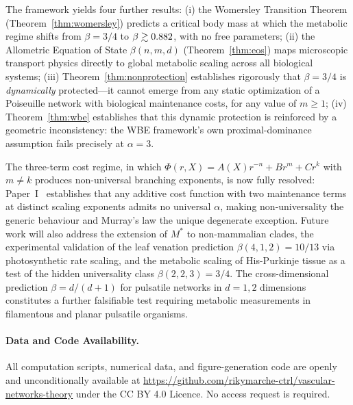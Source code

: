 \documentclass[11pt,a4paper]{article}
\theoremstyle{remark}
\begin{document}
The framework yields four further results: (i) the Womersley Transition Theorem
(Theorem~\ref{thm:womersley}) predicts a critical body mass \MstarRounded{} at which the metabolic
regime shifts from $\beta = 3/4$ to $\beta \gtrsim 0.882{}$, with no
free parameters; (ii) the Allometric Equation of State $\beta(n,m,d)$ (Theorem~\ref{thm:eos}) maps microscopic transport physics directly to global metabolic scaling
across all biological systems; (iii) Theorem~\ref{thm:nonprotection} establishes rigorously that
$\beta = 3/4$ is \textit{dynamically} protected---it cannot emerge from any
static optimization of a Poiseuille network with biological maintenance costs,
for any value of $m \geq 1$; (iv) Theorem~\ref{thm:wbe} establishes that this dynamic
protection is reinforced by a geometric inconsistency: the WBE framework's own
proximal-dominance assumption fails precisely at $\alpha = 3$.

The three-term cost regime, in which $\Phi(r,X) = A(X)r^{-n} + Br^m
+ Cr^k$ with $m \neq k$ produces non-universal branching exponents,
is now fully resolved: Paper~I~\cite{paperI} establishes that any additive
cost function with two maintenance terms at distinct scaling exponents admits
no universal $\alpha$, making non-universality the generic behaviour and
Murray's law the unique degenerate exception.
Future work will also address the extension of $M^*$ to
non-mammalian clades, the experimental validation of the leaf venation
prediction $\beta(4,1,2) = 10/13$ via photosynthetic rate scaling, and the
metabolic scaling of His-Purkinje tissue as a test of the hidden universality
class $\beta(2,2,3) = 3/4$. The cross-dimensional prediction $\beta = d/(d+1)$
for pulsatile networks in $d=1,2$ dimensions constitutes a further falsifiable
test requiring metabolic measurements in filamentous and planar pulsatile
organisms.

\paragraph*{Data and Code Availability.}
All computation scripts, numerical data, and figure-generation code are openly
and unconditionally available at
\url{https://github.com/rikymarche-ctrl/vascular-networks-theory} under the CC BY 4.0
Licence. No access request is required.



\end{document}
